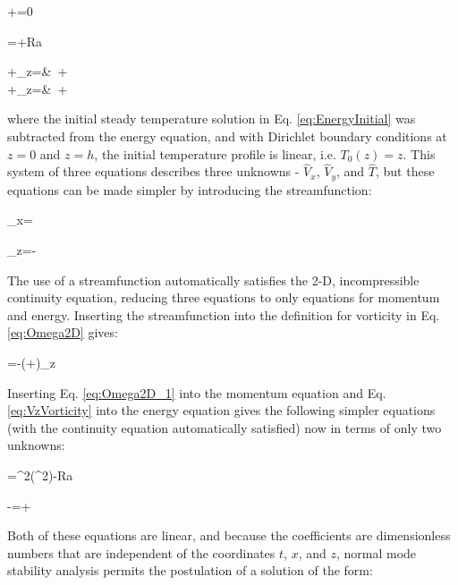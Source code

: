 \documentclass[10pt]{article}
\numberwithin{equation}{section} %
\begin{document}
\beq
{}+=0
\eeq

\beq
{}=\nabla\cdot\nabla\hat{\omega}+Ra
\eeq

\beqa
{}+_z=&\ +\\
+_z=&\ +
\eeqa

where the initial steady temperature solution in Eq. \eqref{eq:EnergyInitial} was subtracted from the energy equation, and with Dirichlet boundary conditions at \(z=0\) and \(z=h\), the initial temperature profile is linear, i.e. \(T_0(z)=z\). This system of three equations describes three unknowns - \(\hat{V}_x\), \(\hat{V}_y\), and \(\hat{T}\), but these equations can be made simpler by introducing the streamfunction:

\beq
{}_x=
\eeq

\beq
\label{eq:VzVorticity}
_z=-
\eeq

The use of a streamfunction automatically satisfies the 2-D, incompressible continuity equation, reducing three equations to only equations for momentum and energy. Inserting the streamfunction into the definition for vorticity in Eq. \eqref{eq:Omega2D} gives:

\beq
\label{eq:Omega2D_1}
\omega=-\left(+\right)_z
\eeq

Inserting Eq. \eqref{eq:Omega2D_1} into the momentum equation and Eq. \eqref{eq:VzVorticity} into the energy equation gives the following simpler equations (with the continuity equation automatically satisfied) now in terms of only two unknowns:

\beq
\label{eq:Mom3}
=\nabla^2\left(\nabla^2\hat{\psi}\right)-Ra
\eeq

\beq
\label{eq:Energy3}
-=+
\eeq

Both of these equations are linear, and because the coefficients are dimensionless numbers that are independent of the coordinates \(t\), \(x\), and \(z\), normal mode stability analysis permits the postulation of a solution of the form:
\end{document}
